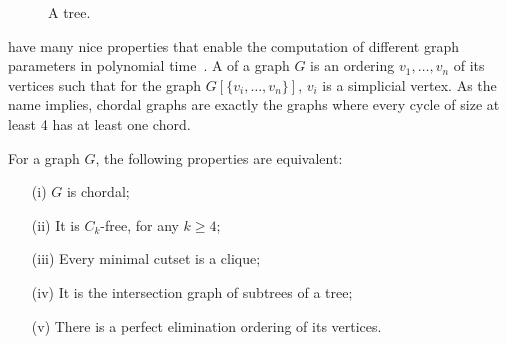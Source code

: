 \begin{figure}
    \centering
    \caption{A tree.}
    \label{fig:some_tree}
\end{figure}


 have many nice properties that enable the computation of different graph parameters in polynomial time~\citep{golumbic}. A  of a graph $G$ is an ordering $v_1, \dots, v_n$ of its vertices such that for the graph $G[\{v_i, \dots, v_n\}]$, $v_i$ is a simplicial vertex. As the name implies, chordal graphs are exactly the graphs where every cycle of size at least 4 has at least one chord. 

\begin{class_definition*}
    For a graph $G$, the following properties are equivalent:
    \begin{itemize}
        \item[(i)] $G$ is chordal;
        \item[(ii)] It is $C_k$-free, for any $k \geq 4$;
        \item[(iii)] Every minimal cutset is a clique;
        \item[(iv)] It is the intersection graph of subtrees of a tree;
        \item[(v)] There is a perfect elimination ordering of its vertices.
    \end{itemize}
\end{class_definition*}

